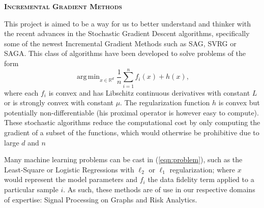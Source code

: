 \documentclass[a4paper,11pt]{article}
\DeclareMathOperator*{\argmin}{arg\,min}
\newcommand{\R}{\mathbb{R}}
\newcommand{\eqnref}[1]{(\ref{eqn:#1})}
\begin{document}
\begin{center} 
	\Large{\textbf{\textsc{Incremental Gradient Methods}}}
\end{center}


This project is aimed to be a way for us to better understand and thinker with
the recent advances in the Stochastic Gradient Descent algorithms, specifically
some of the newest Incremental Gradient Methods such as SAG, SVRG or SAGA. This
class of algorithms have been developed to solve problems of the form
\begin{equation} \label{eqn:problem}
	\argmin_{x \in \R^d} \frac{1}{n} \sum_{i=1}^n f_i(x) + h(x),
\end{equation}
where each $f_i$ is convex and has Libschitz continuous derivatives with
constant $L$ or is strongly convex with constant $\mu$. The regularization
function $h$ is convex but potentially non-differentiable (his proximal operator
is however easy to compute). These stochastic algorithms reduce the
computational cost by only computing the gradient of a subset of the functions,
which would otherwise be prohibitive due to large $d$ and $n$

Many machine learning problems can be cast in \eqnref{problem}, such as the
Least-Square or Logistic Regressions with $\ell_2$ or $\ell_1$ regularization;
where $x$ would represent the model parameters and $f_i$ the data fidelity term
applied to a particular sample $i$. As such, these methods are of use in our
respective domains of expertise: Signal Processing on Graphs and Risk Analytics.
\end{document}
